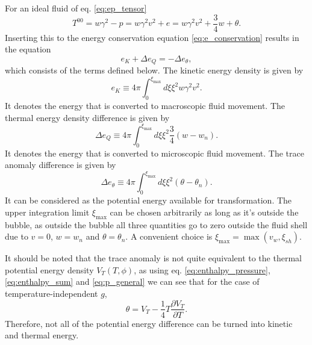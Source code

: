 For an ideal fluid of eq. \eqref{eq:ep_tensor} \cite[eq. B.23]{hindmarsh_gw_pt_2019}
\begin{equation}
T^{00} = w\gamma^2 - p = w\gamma^2 v^2 + e = w\gamma^2 v^2 + \frac{3}{4}w + \theta.
\end{equation}
Inserting this to the energy conservation equation \eqref{eq:e_conservation} results in the equation \cite[eq. B.24]{hindmarsh_gw_pt_2019}
\begin{equation}
e_K + \Delta e_Q = - \Delta e_\theta,
\label{eq:energy_components}
\end{equation}
which consists of the terms defined below.
The kinetic energy density is given by
\begin{equation}
e_K \equiv 4 \pi \int_0^{\xi_\text{max}} d\xi \xi^2 w \gamma^2 v^2.
\label{eq:kinetic_energy_density}
\end{equation}
It denotes the energy that is converted to macroscopic fluid movement.
The thermal energy density difference is given by
\begin{equation}
\Delta e_Q \equiv 4 \pi \int_0^{\xi_\text{max}} d\xi \xi^2 \frac{3}{4} (w - w_n).
\label{eq:thermal_energy_density}
\end{equation}
It denotes the energy that is converted to microscopic fluid movement.
The trace anomaly difference is given by
\begin{equation}
\Delta e_\theta \equiv 4 \pi \int_0^{\xi_\text{max}} d\xi \xi^2 (\theta - \theta_n).
\end{equation}
It can be considered as the potential energy available for transformation.
The upper integration limit $\xi_\text{max}$ can be chosen arbitrarily as long as it's outside the bubble, as outside the bubble all three quantities go to zero outside the fluid shell due to $v=0$, $w=w_n$ and $\theta = \theta_n$.
A convenient choice is $\xi_\text{max} = \max (v_w, \xi_{sh})$.
\cite[eq. B.25]{hindmarsh_gw_pt_2019}

It should be noted that the trace anomaly is not quite equivalent to the thermal potential energy density $V_T(T,\phi)$, as using eq. \eqref{eq:enthalpy_pressure}, \eqref{eq:enthalpy_sum} and \eqref{eq:p_general} we can see that for the case of temperature-independent $g$,
\begin{equation}
\theta = V_T - \frac{1}{4} T \frac{\partial V_T}{\partial T}.
\end{equation}
Therefore, not all of the potential energy difference can be turned into kinetic and thermal energy.
\cite[ch. B.2]{hindmarsh_gw_pt_2019}

